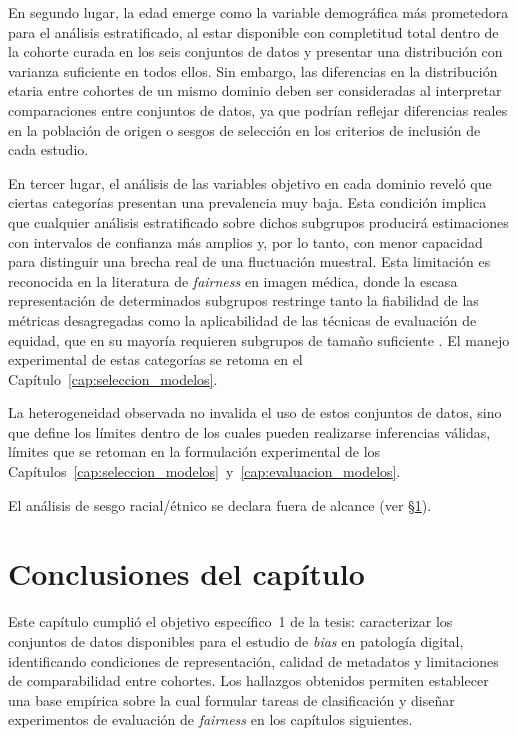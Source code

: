 En segundo lugar, la edad emerge como la variable demográfica más prometedora para el análisis estratificado, al estar disponible con completitud total dentro de la cohorte curada en los seis conjuntos de datos y presentar una distribución con varianza suficiente en todos ellos. Sin embargo, las diferencias en la distribución etaria entre cohortes de un mismo dominio deben ser consideradas al interpretar comparaciones entre conjuntos de datos, ya que podrían reflejar diferencias reales en la población de origen o sesgos de selección en los criterios de inclusión de cada estudio.

En tercer lugar, el análisis de las variables objetivo en cada dominio reveló que ciertas categorías presentan una prevalencia muy baja. Esta condición implica que cualquier análisis estratificado sobre dichos subgrupos producirá estimaciones con intervalos de confianza más amplios y, por lo tanto, con menor capacidad para distinguir una brecha real de una fluctuación muestral. Esta limitación es reconocida en la literatura de \textit{fairness} en imagen médica, donde la escasa representación de determinados subgrupos restringe tanto la fiabilidad de las métricas desagregadas como la aplicabilidad de las técnicas de evaluación de equidad, que en su mayoría requieren subgrupos de tamaño suficiente \parencite{riccilara2022fairness,wastvedt2024small}. El manejo experimental de estas categorías se retoma en el Capítulo~\ref{cap:seleccion_modelos}.

La heterogeneidad observada no invalida el uso de estos conjuntos de datos, sino que define los límites dentro de los cuales pueden realizarse inferencias válidas, límites que se retoman en la formulación experimental de los Capítulos~\ref{cap:seleccion_modelos}~y~\ref{cap:evaluacion_modelos}.

El análisis de sesgo racial/étnico se declara fuera de alcance (ver §\ref{sec:conclusiones_capitulo4}).

\section{Conclusiones del capítulo}
\label{sec:conclusiones_capitulo4}

Este capítulo cumplió el objetivo específico~1 de la tesis: caracterizar los conjuntos de datos disponibles para el estudio de \textit{bias} en patología digital, identificando condiciones de representación, calidad de metadatos y limitaciones de comparabilidad entre cohortes. Los hallazgos obtenidos permiten establecer una base empírica sobre la cual formular tareas de clasificación y diseñar experimentos de evaluación de \textit{fairness} en los capítulos siguientes.

